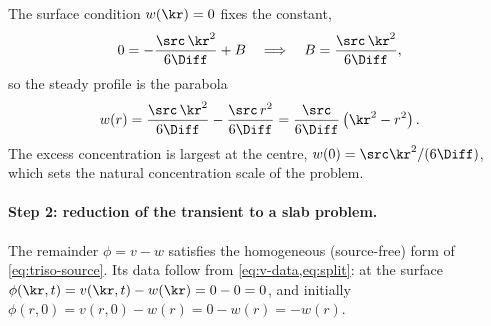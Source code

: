 %
The surface condition $w(\kr) = 0$ fixes the constant,
%
\begin{equation}
  0 = -\frac{\src\, \kr^{2}}{6\Diff} + B
  \quad \Longrightarrow \quad
  B = \frac{\src\, \kr^{2}}{6\Diff} ,
\end{equation}
%
so the steady profile is the parabola
%
\begin{equation}
  w(r) = \frac{\src\, \kr^{2}}{6\Diff} - \frac{\src\, r^{2}}{6\Diff}
  = \frac{\src}{6\Diff}\left( \kr^{2} - r^{2} \right) .
  \label{eq:steady}
\end{equation}
%
The excess concentration is largest at the centre, $w(0) = \src \kr^{2}/(6\Diff)$,
which sets the natural concentration scale of the problem.

\paragraph{Step 2: reduction of the transient to a slab problem.}
The remainder $\phi = v - w$ satisfies the homogeneous (source-free) form of
\cref{eq:triso-source}. Its data follow from \cref{eq:v-data,eq:split}: at the
surface $\phi(\kr,t) = v(\kr,t) - w(\kr) = 0 - 0 = 0$, and initially
$\phi(r,0) = v(r,0) - w(r) = 0 - w(r) = -w(r)$.

